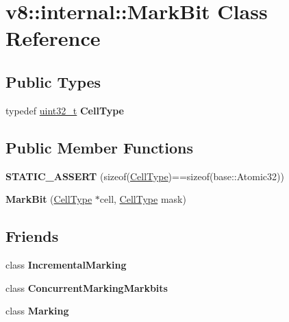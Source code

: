 \hypertarget{classv8_1_1internal_1_1MarkBit}{}\section{v8\+:\+:internal\+:\+:Mark\+Bit Class Reference}
\label{classv8_1_1internal_1_1MarkBit}
\subsection*{Public Types}
\begin{DoxyCompactItemize}
\item 
\mbox{\label{classv8_1_1internal_1_1MarkBit_a05d951ad2b52f7096758d8c3cbf15ac3}} 
typedef \mbox{\hyperlink{classuint32__t}{uint32\+\_\+t}} {\bfseries Cell\+Type}
\end{DoxyCompactItemize}
\subsection*{Public Member Functions}
\begin{DoxyCompactItemize}
\item 
\mbox{\label{classv8_1_1internal_1_1MarkBit_a939da14b984cf7889e7de30164929f70}} 
{\bfseries S\+T\+A\+T\+I\+C\+\_\+\+A\+S\+S\+E\+RT} (sizeof(\mbox{\hyperlink{classuint32__t}{Cell\+Type}})==sizeof(base\+::\+Atomic32))
\item 
\mbox{\label{classv8_1_1internal_1_1MarkBit_a4f7426d997f3cd933036f09132b01ed6}} 
{\bfseries Mark\+Bit} (\mbox{\hyperlink{classuint32__t}{Cell\+Type}} $\ast$cell, \mbox{\hyperlink{classuint32__t}{Cell\+Type}} mask)
\end{DoxyCompactItemize}
\subsection*{Friends}
\begin{DoxyCompactItemize}
\item 
\mbox{\label{classv8_1_1internal_1_1MarkBit_abe19bf8497a23b6101b9916f8ac1d587}} 
class {\bfseries Incremental\+Marking}
\item 
\mbox{\label{classv8_1_1internal_1_1MarkBit_a91e070565fa79f3dee503e08a688af79}} 
class {\bfseries Concurrent\+Marking\+Markbits}
\item 
\mbox{\label{classv8_1_1internal_1_1MarkBit_a59e3efd9691438a0b59a4f16b9aedeba}} 
class {\bfseries Marking}
\end{DoxyCompactItemize}


